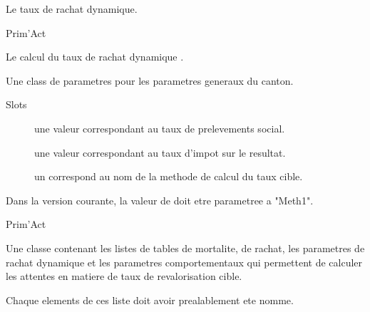 \documentclass[a4paper]{book}
\begin{document}
%
\begin{Value}
Le taux de rachat dynamique.
\end{Value}
%
\begin{Author}\relax
Prim'Act
\end{Author}
%
\begin{SeeAlso}\relax
Le calcul du taux de rachat dynamique .
\end{SeeAlso}
%
\begin{Description}\relax
Une class de parametres pour les parametres generaux du canton.
\end{Description}
%
\begin{Section}{Slots}

\begin{description}

\item[] une valeur  correspondant au taux de prelevements social.

\item[] une valeur  correspondant au taux d'impot sur le resultat.

\item[] un  correspond au nom de la methode de calcul du taux cible.

\end{description}
\end{Section}
%
\begin{Note}\relax
Dans la version courante, la valeur de  doit etre parametree a "Meth1".
\end{Note}
%
\begin{Author}\relax
Prim'Act
\end{Author}
%
\begin{Description}\relax
Une classe contenant les listes de tables de mortalite, de rachat, les parametres de rachat dynamique et
les parametres comportementaux qui permettent
de calculer les attentes en matiere de taux de revalorisation cible.
\end{Description}
%
\begin{Details}\relax
Chaque elements de ces liste doit avoir prealablement ete nomme.
\end{Details}
\end{document}

